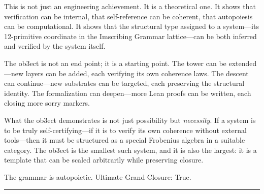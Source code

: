 \documentclass[12pt,a4paper]{article}
\begin{document}
This is not just an engineering achievement. It is a theoretical one. It shows that verification can be internal, that self-reference can be coherent, that autopoiesis can be computational. It shows that the structural type assigned to a system---its 12-primitive coordinate in the Imscribing Grammar lattice---can be both inferred and verified by the system itself.

The ob3ect is not an end point; it is a starting point. The tower can be extended---new layers can be added, each verifying its own coherence laws. The descent can continue---new substrates can be targeted, each preserving the structural identity. The formalization can deepen---more Lean proofs can be written, each closing more sorry markers.

What the ob3ect demonstrates is not just possibility but \emph{necessity}. If a system is to be truly self-certifying---if it is to verify its own coherence without external tools---then it must be structured as a special Frobenius algebra in a suitable category. The ob3ect is the smallest such system, and it is also the largest: it is a template that can be scaled arbitrarily while preserving closure.

The grammar is autopoietic. Ultimate Grand Closure: True.

\begin{center}
\rule{0.5\textwidth}{0.4pt}
\end{center}
\end{document}
